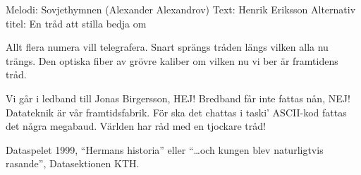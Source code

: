 \begin{song}

\begin{songmeta}
Melodi: Sovjethymnen (Alexander Alexandrov)
Text: Henrik Eriksson
Alternativ titel: En tråd att stilla bedja om
\end{songmeta}

\begin{songtext}
Allt flera numera
vill telegrafera.
Snart sprängs tråden längs
vilken alla nu trängs.
Den optiska fiber
av grövre kaliber
om vilken nu vi ber
är framtidens tråd.

Vi går i ledband till Jonas Birgersson, HEJ!
Bredband får inte fattas nån, NEJ!
Datateknik är vår framtidsfabrik.
För ska det chattas i taski' ASCII-kod
fattas det några megabaud.
Världen har råd
med en tjockare tråd!
\end{songtext}

\begin{songnotes}
Dataspelet 1999, \textquotedblleft{}Hermans historia\textquotedblright{} eller \textquotedblleft{}\ldots{}och kungen blev
naturligtvis rasande\textquotedblright{}, Datasektionen KTH.
\end{songnotes}
\end{song}

